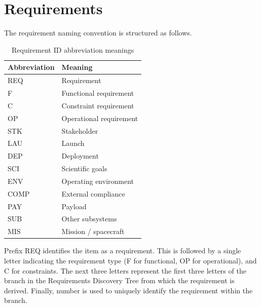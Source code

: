 
\appendix
\chapter{Requirements}
\small
\noindent The requirement naming convention is structured as follows. 

\begin{table}[H]
\centering
\renewcommand{\arraystretch}{0.9}
\small
\caption{Requirement ID abbreviation meanings}
\label{tab:req_id_abbreviations}
\begin{tabular}{ll}
\hline
\textbf{Abbreviation} & \textbf{Meaning} \\
\hline
REQ & Requirement \\
F & Functional requirement \\
C & Constraint requirement \\
OP & Operational requirement \\
STK & Stakeholder \\
LAU & Launch \\
DEP & Deployment \\
SCI & Scientific goals \\
ENV & Operating environment \\
COMP & External compliance \\
PAY & Payload \\
SUB & Other subsystems \\
MIS & Mission / spacecraft \\
\hline
\end{tabular}
\end{table}


\noindent Prefix REQ identifies the item as a requirement. This is followed by a single letter indicating the requirement type (F for functional, OP for operational), and C for constraints. The next three letters represent the first three letters of the branch in the Requirements Discovery Tree from which the requirement is derived. Finally, number is used to uniquely identify the requirement within the branch.


